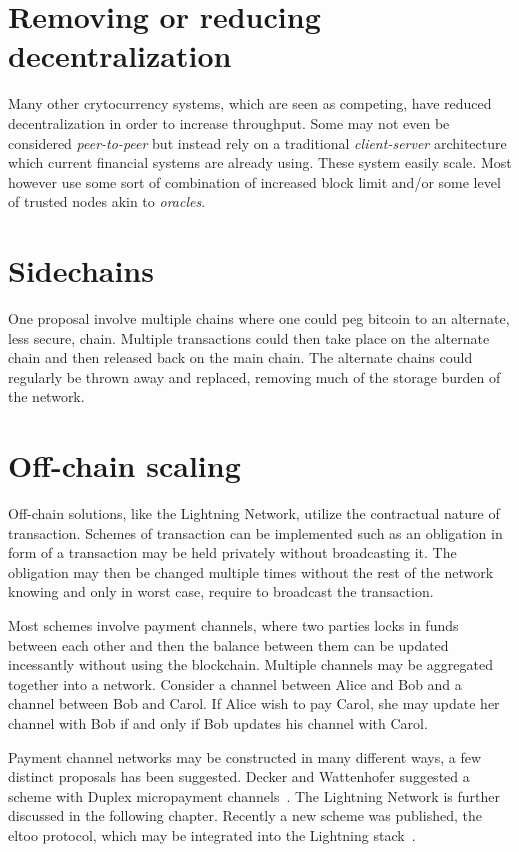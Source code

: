 \section{Removing or reducing decentralization}

Many other crytocurrency systems, which are seen as competing, have reduced decentralization in order to increase throughput. Some may not even be considered \textit{peer-to-peer} but instead rely on a traditional \textit{client-server} architecture which current financial systems are already using. These system easily scale. Most however use some sort of combination of increased block limit and/or some level of trusted nodes akin to \textit{oracles}.  

\section{Sidechains}

One proposal involve multiple chains where one could peg bitcoin to an alternate, less secure, chain. Multiple transactions could then take place on the alternate chain and then released back on the main chain. The alternate chains could regularly be thrown away and replaced, removing much of the storage burden of the network.~\cite{blockstream:sidechain}

\section{Off-chain scaling}

Off-chain solutions, like the \gls{Lightning Network}, utilize the contractual nature of transaction. Schemes of transaction can be implemented such as an obligation in form of a transaction may be held privately without broadcasting it. The obligation may then be changed multiple times without the rest of the network knowing and only in worst case, require to broadcast the transaction. 

Most schemes involve payment channels, where two parties locks in funds between each other and then the balance between them can be updated incessantly without using the blockchain. Multiple channels may be aggregated together into a network. Consider a channel between Alice and Bob and a channel between Bob and Carol. If Alice wish to pay Carol, she may update her channel with Bob if and only if Bob updates his channel with Carol.  

Payment channel networks may be constructed in many different ways, a few distinct proposals has been suggested. Decker and Wattenhofer suggested a scheme with Duplex micropayment channels~\cite{decker:wattenhofer:duplex}. The \gls{Lightning Network} is further discussed in the following chapter. Recently a new scheme was published, the eltoo protocol, which may be integrated into the Lightning stack~\cite{decker:russell:Osuntokun:eltoo}.   


